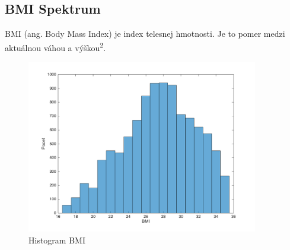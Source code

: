 \subsection{BMI Spektrum}

BMI (ang. Body Mass Index) je index telesnej hmotnosti. Je to pomer medzi aktuálnou váhou a výškou\textsuperscript 2.

\begin{figure}[h!]
	\centering
  		\includegraphics[width=0.9\textwidth]{histBmi.png}
  	\caption{Histogram BMI}
  	\label{fig:hist-bmi}
\end{figure}














































